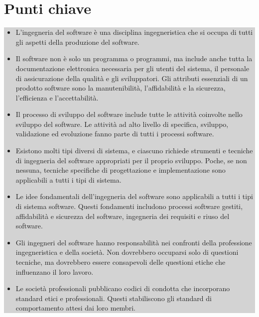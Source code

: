 \section{Punti chiave}
\begin{center}
\begin{minipage}{\textwidth}
\colorbox{lightgray}{
\parbox{\linewidth}{
\begin{itemize}
    \item L'ingegneria del software è una disciplina ingegneristica che si occupa di tutti gli aspetti della produzione del software. 
    \item Il software non è solo un programma o programmi, ma include anche tutta la documentazione elettronica necessaria per gli utenti del sistema, il personale di assicurazione della qualità e gli sviluppatori. Gli attributi essenziali di un prodotto software sono la manutenibilità, l'affidabilità e la sicurezza, l'efficienza e l'accettabilità. 
    \item Il processo di sviluppo del software include tutte le attività coinvolte nello sviluppo del software. Le attività ad alto livello di specifica, sviluppo, validazione ed evoluzione fanno parte di tutti i processi software. 
    \item Esistono molti tipi diversi di sistema, e ciascuno richiede strumenti e tecniche di ingegneria del software appropriati per il proprio sviluppo. Poche, se non nessuna, tecniche specifiche di progettazione e implementazione sono applicabili a tutti i tipi di sistema.
    \item Le idee fondamentali dell'ingegneria del software sono applicabili a tutti i tipi di sistema software. Questi fondamenti includono processi software gestiti, affidabilità e sicurezza del software, ingegneria dei requisiti e riuso del software. 
    \item Gli ingegneri del software hanno responsabilità nei confronti della professione ingegneristica e della società. Non dovrebbero occuparsi solo di questioni tecniche, ma dovrebbero essere consapevoli delle questioni etiche che influenzano il loro lavoro. 
    \item Le società professionali pubblicano codici di condotta che incorporano standard etici e professionali. Questi stabiliscono gli standard di comportamento attesi dai loro membri.
\end{itemize}
}}
\end{minipage}
\end{center}